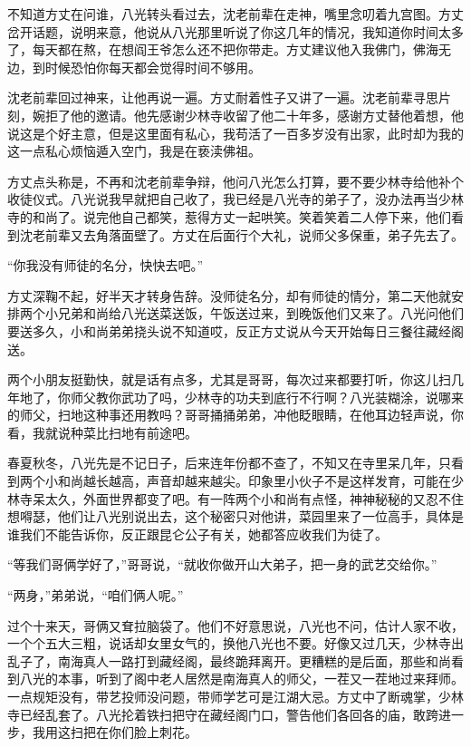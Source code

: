 不知道方丈在问谁，八光转头看过去，沈老前辈在走神，嘴里念叨着九宫图。方丈岔开话题，说明来意，他说从八光那里听说了你这几年的情况，我知道你时间太多了，每天都在熬，在想阎王爷怎么还不把你带走。方丈建议他入我佛门，佛海无边，到时候恐怕你每天都会觉得时间不够用。

沈老前辈回过神来，让他再说一遍。方丈耐着性子又讲了一遍。沈老前辈寻思片刻，婉拒了他的邀请。他先感谢少林寺收留了他二十年多，感谢方丈替他着想，他说这是个好主意，但是这里面有私心，我苟活了一百多岁没有出家，此时却为我的这一点私心烦恼遁入空门，我是在亵渎佛祖。

方丈点头称是，不再和沈老前辈争辩，他问八光怎么打算，要不要少林寺给他补个收徒仪式。八光说我早就把自己收了，我已经是八光寺的弟子了，没办法再当少林寺的和尚了。说完他自己都笑，惹得方丈一起哄笑。笑着笑着二人停下来，他们看到沈老前辈又去角落面壁了。方丈在后面行个大礼，说师父多保重，弟子先去了。

“你我没有师徒的名分，快快去吧。”

方丈深鞠不起，好半天才转身告辞。没师徒名分，却有师徒的情分，第二天他就安排两个小兄弟和尚给八光送菜送饭，午饭送过来，到晚饭他们又来了。八光问他们要送多久，小和尚弟弟挠头说不知道哎，反正方丈说从今天开始每日三餐往藏经阁送。

两个小朋友挺勤快，就是话有点多，尤其是哥哥，每次过来都要打听，你这儿扫几年地了，你师父教你武功了吗，少林寺的功夫到底行不行啊？八光装糊涂，说哪来的师父，扫地这种事还用教吗？哥哥捅捅弟弟，冲他眨眼睛，在他耳边轻声说，你看，我就说种菜比扫地有前途吧。

春夏秋冬，八光先是不记日子，后来连年份都不查了，不知又在寺里呆几年，只看到两个小和尚越长越高，声音却越来越尖。印象里小伙子不是这样发育，可能在少林寺呆太久，外面世界都变了吧。有一阵两个小和尚有点怪，神神秘秘的又忍不住想嘚瑟，他们让八光别说出去，这个秘密只对他讲，菜园里来了一位高手，具体是谁我们不能告诉你，反正跟昆仑公子有关，她都答应收我们为徒了。

“等我们哥俩学好了，”哥哥说，“就收你做开山大弟子，把一身的武艺交给你。”

“两身，”弟弟说，“咱们俩人呢。”

过个十来天，哥俩又耷拉脑袋了。他们不好意思说，八光也不问，估计人家不收，一个个五大三粗，说话却女里女气的，换他八光也不要。好像又过几天，少林寺出乱子了，南海真人一路打到藏经阁，最终跪拜离开。更糟糕的是后面，那些和尚看到八光的本事，听到了阁中老人居然是南海真人的师父，一茬又一茬地过来拜师。一点规矩没有，带艺投师没问题，带师学艺可是江湖大忌。方丈中了断魂掌，少林寺已经乱套了。八光抡着铁扫把守在藏经阁门口，警告他们各回各的庙，敢跨进一步，我用这扫把在你们脸上刺花。

